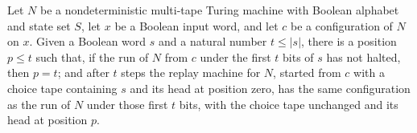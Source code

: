 \begin{theorem}
\label{Turing.NDTM.replayTM_runFrom}
\leanok
{}
Let $N$ be a nondeterministic multi-tape Turing machine with Boolean alphabet and state
set $S$, let $x$ be a Boolean input word, and let $c$ be a configuration of $N$ on $x$.
Given a Boolean word $s$ and a natural number $t\le |s|$, there is a position $p\le t$
such that, if the run of $N$ from $c$ under the first $t$ bits of $s$ has not halted,
then $p=t$; and after $t$ steps the replay machine for $N$, started from $c$ with a
choice tape containing $s$ and its head at position zero, has the same configuration as
the run of $N$ under those first $t$ bits, with the choice tape unchanged and its head
at position $p$.
\end{theorem}

